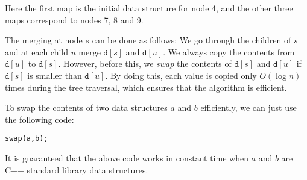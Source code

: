 \begin{center}
\end{center}

Here the first map is the initial data structure
for node 4,
and the other three maps correspond to nodes 7, 8 and 9.

The merging at node $s$ can be done as follows:
We go through the children of $s$
and at each child $u$ merge $\texttt{d}[s]$
and $\texttt{d}[u]$.
We always copy the contents from $\texttt{d}[u]$
to $\texttt{d}[s]$.
However, before this, we \emph{swap}
the contents of $\texttt{d}[s]$ and $\texttt{d}[u]$
if $\texttt{d}[s]$ is smaller than $\texttt{d}[u]$.
By doing this, each value is copied only $O(\log n)$
times during the tree traversal,
which ensures that the algorithm is efficient.

To swap the contents of two data structures $a$ and $b$
efficiently, we can just use the following code:
\begin{lstlisting}
swap(a,b);
\end{lstlisting}
It is guaranteed that the above code works in constant time
when $a$ and $b$ are C++ standard library data structures.

